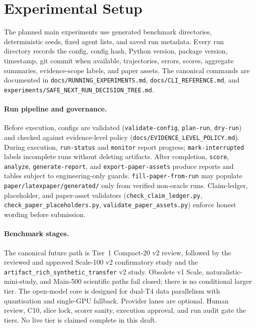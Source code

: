 \section{Experimental Setup}

The planned main experiments use generated benchmark directories, deterministic seeds, fixed agent lists, and saved run metadata. Every run directory records the config, config hash, Python version, package version, timestamp, git commit when available, trajectories, errors, scores, aggregate summaries, evidence-scope labels, and paper assets. The canonical commands are documented in \texttt{docs/RUNNING\_EXPERIMENTS.md}, \texttt{docs/CLI\_REFERENCE.md}, and \texttt{experiments/SAFE\_NEXT\_RUN\_DECISION\_TREE.md}.

\paragraph{Run pipeline and governance.}
Before execution, configs are validated (\texttt{validate-config}, \texttt{plan-run}, \texttt{dry-run}) and checked against evidence-level policy (\texttt{docs/EVIDENCE\_LEVEL\_POLICY.md}). During execution, \texttt{run-status} and \texttt{monitor} report progress; \texttt{mark-interrupted} labels incomplete runs without deleting artifacts. After completion, \texttt{score}, \texttt{analyze}, \texttt{generate-report}, and \texttt{export-paper-assets} produce reports and tables subject to engineering-only guards. \texttt{fill-paper-from-run} may populate \texttt{paper/latexpaper/generated/} only from verified non-oracle runs. Claim-ledger, placeholder, and paper-asset validators (\texttt{check\_claim\_ledger.py}, \texttt{check\_paper\_placeholders.py}, \texttt{validate\_paper\_assets.py}) enforce honest wording before submission.

\paragraph{Benchmark stages.}
The canonical future path is Tier~1 Compact-20 v2 review, followed by the
reviewed and approved Scale-100 v2 confirmatory study and the
\texttt{artifact\_rich\_synthetic\_transfer} v2 study. Obsolete v1 Scale,
naturalistic-mini-study, and Main-500 scientific paths fail closed; there is no
conditional larger tier. The open-model core is designed for dual-T4 data parallelism with
quantisation and single-GPU fallback. Provider lanes are optional. Human review,
C10, slice lock, scorer sanity, execution approval, and run audit gate the
tiers. No live tier is claimed complete in this draft.

